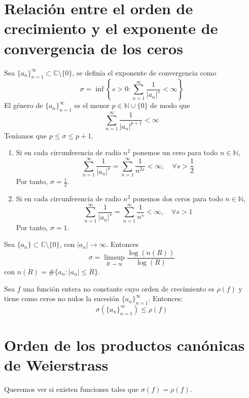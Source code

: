 \section{Relación entre el orden de crecimiento y el exponente de convergencia de los ceros}
Sea $\{a_n\}_{n=1}^\infty \subset \mathbb{C} \setminus \{0\}$, se definía el exponente de convergencia como
$$\sigma = \inf\left\{s > 0 : \sum_{n=1}^\infty \frac{1}{|a_n|^s} < \infty\right\}$$
El género de $\{a_n\}_{n=1}^\infty$ es el menor $p \in \mathbb{N} \cup \{0\}$ de modo que
$$\sum_{n=1}^\infty \frac{1}{|a_n|^{p+1}} < \infty$$
Teníamos que $p \leq \sigma \leq p+1$.

\begin{example}
    \hfill
    \begin{enumerate}
        \item Si en cada circunferencia de radio $n^2$ ponemos un cero para todo $n \in \mathbb{N}$,
              $$\sum_{n=1}^\infty \frac{1}{|a_n|^s} = \sum_{n=1}^\infty \frac{1}{n^{2s}} < \infty, \quad \forall s > \frac{1}{2}$$
              Por tanto, $\sigma = \frac{1}{2}$.

        \item Si en cada circunferencia de radio $n^2$ ponemos dos ceros para todo $n \in \mathbb{N}$,
              $$\sum_{n=1}^\infty \frac{1}{|a_n|^s} = \sum_{n=1}^\infty \frac{1}{n^{s}} < \infty, \quad \forall s > 1$$
              Por tanto, $\sigma = 1$.
    \end{enumerate}
\end{example}

\begin{lemma}
    Sea $\{a_n\} \subset \mathbb{C} \setminus \{0\}$, con $|a_n| \to \infty$.
    Entonces
    $$\sigma = \limsup_{R \to \infty} \frac{\log(n(R))}{\log(R)}$$
    con $n(R) = \#\{a_n : |a_n| \leq R\}$.
\end{lemma}


\begin{theorem}
    Sea $f$ una función entera no constante cuyo orden de crecimiento es $\rho(f)$ y tiene como ceros no nulos la sucesión $\{a_n\}_{n=1}^\infty$.
    Entonces:
    $$\sigma(\{a_n\}_{n=1}^\infty) \leq \rho(f)$$
\end{theorem}


\section{Orden de los productos canónicas de Weierstrass}
Queremos ver si existen funciones tales que $\sigma(f) = \rho(f)$.

